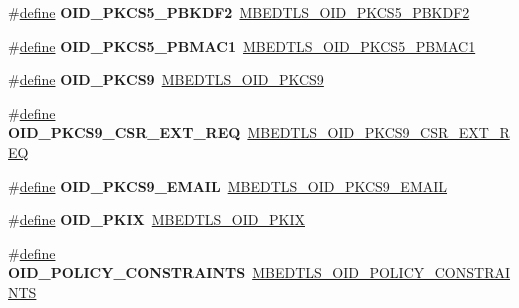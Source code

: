 \begin{DoxyCompactItemize}
\item 
\mbox{\label{compat-1_83_8h_a550e322a6f7502ffc76d5b5dee67e932}} 
\#\hyperlink{structdefine}{define} {\bfseries O\+I\+D\+\_\+\+P\+K\+C\+S5\+\_\+\+P\+B\+K\+D\+F2}~\hyperlink{oid_8h_a500875913ec198a978aab4861ae59079}{M\+B\+E\+D\+T\+L\+S\+\_\+\+O\+I\+D\+\_\+\+P\+K\+C\+S5\+\_\+\+P\+B\+K\+D\+F2}
\item 
\mbox{\label{compat-1_83_8h_afe4e0da5693667f9ea40a5df9f6d1c61}} 
\#\hyperlink{structdefine}{define} {\bfseries O\+I\+D\+\_\+\+P\+K\+C\+S5\+\_\+\+P\+B\+M\+A\+C1}~\hyperlink{oid_8h_ac7e49c8e39ff6948e28e52a77da53b0d}{M\+B\+E\+D\+T\+L\+S\+\_\+\+O\+I\+D\+\_\+\+P\+K\+C\+S5\+\_\+\+P\+B\+M\+A\+C1}
\item 
\mbox{\label{compat-1_83_8h_a83854c65d3947ccff4c7b6b1dc2195b2}} 
\#\hyperlink{structdefine}{define} {\bfseries O\+I\+D\+\_\+\+P\+K\+C\+S9}~\hyperlink{oid_8h_acfde345687a3ba616fde6f1a67e5b235}{M\+B\+E\+D\+T\+L\+S\+\_\+\+O\+I\+D\+\_\+\+P\+K\+C\+S9}
\item 
\mbox{\label{compat-1_83_8h_aa550dfc59d7003fde6fba617a3419126}} 
\#\hyperlink{structdefine}{define} {\bfseries O\+I\+D\+\_\+\+P\+K\+C\+S9\+\_\+\+C\+S\+R\+\_\+\+E\+X\+T\+\_\+\+R\+EQ}~\hyperlink{oid_8h_a683642cedc9dfe3b005e123a3d828e0f}{M\+B\+E\+D\+T\+L\+S\+\_\+\+O\+I\+D\+\_\+\+P\+K\+C\+S9\+\_\+\+C\+S\+R\+\_\+\+E\+X\+T\+\_\+\+R\+EQ}
\item 
\mbox{\label{compat-1_83_8h_af0fac7acdd45c0c38eb50aa675c73f54}} 
\#\hyperlink{structdefine}{define} {\bfseries O\+I\+D\+\_\+\+P\+K\+C\+S9\+\_\+\+E\+M\+A\+IL}~\hyperlink{oid_8h_a906ce873f43785cddfd0e0b47d6301e2}{M\+B\+E\+D\+T\+L\+S\+\_\+\+O\+I\+D\+\_\+\+P\+K\+C\+S9\+\_\+\+E\+M\+A\+IL}
\item 
\mbox{\label{compat-1_83_8h_a81d4657c41d7667bdef2d4c2f011b3cb}} 
\#\hyperlink{structdefine}{define} {\bfseries O\+I\+D\+\_\+\+P\+K\+IX}~\hyperlink{oid_8h_ac711a26e8da91c73d27d7cd582d2d6d8}{M\+B\+E\+D\+T\+L\+S\+\_\+\+O\+I\+D\+\_\+\+P\+K\+IX}
\item 
\mbox{\label{compat-1_83_8h_ae47ddb7a65cc647ba27f5269be50a2af}} 
\#\hyperlink{structdefine}{define} {\bfseries O\+I\+D\+\_\+\+P\+O\+L\+I\+C\+Y\+\_\+\+C\+O\+N\+S\+T\+R\+A\+I\+N\+TS}~\hyperlink{oid_8h_a50d5ff081bcca9a268cf4e2145d65145}{M\+B\+E\+D\+T\+L\+S\+\_\+\+O\+I\+D\+\_\+\+P\+O\+L\+I\+C\+Y\+\_\+\+C\+O\+N\+S\+T\+R\+A\+I\+N\+TS}

\end{DoxyCompactItemize}
